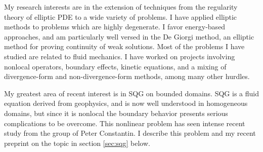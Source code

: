 %
%
%
%
%
%
%


My research interests are in the extension of techniques from the regularity theory of elliptic PDE to a wide variety of problems.  I have applied elliptic methods to problems which are highly degenerate.  I favor energy-based approaches, and am particularly well versed in the De Giorgi method, an elliptic method for proving continuity of weak solutions.  Most of the problems I have studied are related to fluid mechanics.  I have worked on projects involving nonlocal operators, boundary effects, kinetic equations, and a mixing of divergence-form and non-divergence-form methods, among many other hurdles.   

My greatest area of recent interest is in SQG on bounded domains. SQG is a fluid equation derived from geophysics, and is now well understood in homogeneous domains, but since it is nonlocal the boundary behavior presents serious complications to be overcome.  This nonlinear problem has seen intense recent study from the group of Peter Constantin.  I describe this problem and my recent preprint on the topic \cite{StVa.sqg} in section \ref{sec:sqg} below.  

